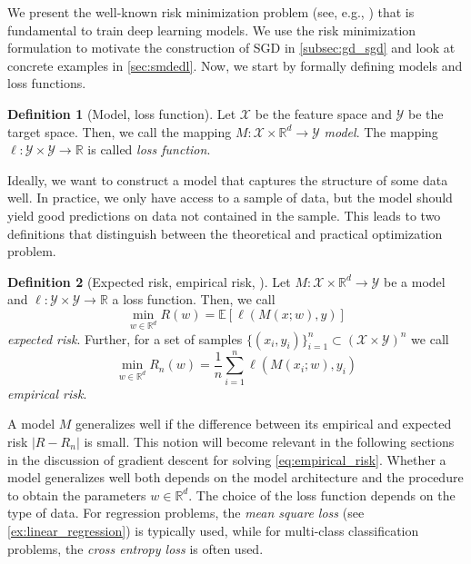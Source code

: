 \documentclass[12pt]{article}
\theoremstyle{definition}
\newtheorem{definition}[definition]{Definition}
\numberwithin{equation}{section}
\newcommand{\R}{\mathbb{R}}
\newcommand{\ev}[1]{\mathbb{E}\left[{#1}\right]}
\begin{document}
We present the well-known risk minimization problem (see, e.g., \cite{bottouOptimizationMethodsLargeScale2018}) that is fundamental to train deep learning models. We use the risk minimization formulation to motivate the construction of SGD in \autoref{subsec:gd_sgd} and look at concrete examples in \autoref{sec:smdedl}. Now, we start by formally defining models and loss functions.
\begin{definition}[Model, loss function]
  Let $\mathcal{X}$ be the feature space and $\mathcal{Y}$ be the target space. Then, we call the mapping $M : \mathcal{X} \times \R^d \rightarrow \mathcal{Y}$ \emph{model}. The mapping $\ell : \mathcal{Y} \times \mathcal{Y} \rightarrow \R$ is called \emph{loss function}.
\end{definition}
Ideally, we want to construct a model that captures the structure of some data well. In practice, we only have access to a sample of data, but the model should yield good predictions on data not contained in the sample. This leads to two definitions that distinguish between the theoretical and practical optimization problem.
\begin{definition}[Expected risk, empirical risk, ]
  Let $M : \mathcal{X} \times \R^d \rightarrow \mathcal{Y}$ be a model and $\ell : \mathcal{Y} \times \mathcal{Y} \rightarrow \R$ a loss function. Then, we call
  \begin{equation}
  \min_{w \in \R^d} R(w) = \ev{\ell(M(x;w),y)}
\end{equation}
\emph{expected risk}. Further, for a set of samples $\{(x_i, y_i)\}_{i=1}^n \subset (\mathcal{X} \times  \mathcal{Y})^n$ we call
\begin{equation}
  \label{eq:empirical_risk}
  \min_{w \in \R^d}  R_n(w) = \frac{1}{n}\sum_{i=1}^n\ell(M(x_i;w),y_i)
\end{equation}
\emph{empirical risk}.
\end{definition}
A model $M$ generalizes well if the difference between its empirical and expected risk $|R - R_n|$ is small. This notion will become relevant in the following sections in the discussion of gradient descent for solving \eqref{eq:empirical_risk}. Whether a model generalizes well both depends on the model architecture and the procedure to obtain the parameters $w \in \R^d$. 
The choice of the loss function depends on the type of data. For regression problems, the \emph{mean square loss} (see \autoref{ex:linear_regression}) is typically used, while for multi-class classification problems, the \emph{cross entropy loss} is often used.
\end{document}

